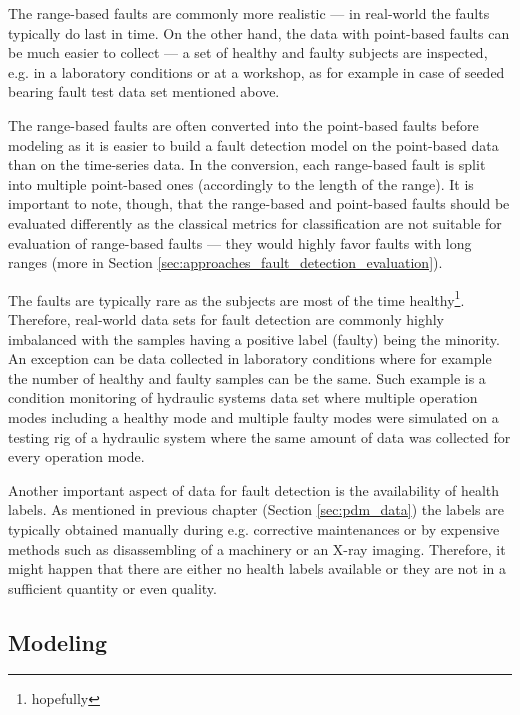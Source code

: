 The range-based faults are commonly more realistic --- in real-world the faults typically do last in time.
On the other hand, the data with point-based faults can be much easier to collect --- a set of healthy and faulty subjects are inspected, e.g. in a laboratory conditions or at a workshop, as for example in case of seeded bearing fault test data set mentioned above.

The range-based faults are often converted into the point-based faults before modeling as it is easier to build a fault detection model on the point-based data than on the time-series data.
In the conversion, each range-based fault is split into multiple point-based ones (accordingly to the length of the range).
It is important to note, though, that the range-based and point-based faults should be evaluated differently as the classical metrics for classification are not suitable for evaluation of range-based faults --- they would highly favor faults with long ranges (more in Section \ref{sec:approaches_fault_detection_evaluation}).

The faults are typically rare as the subjects are most of the time  healthy\footnote{hopefully}.
Therefore, real-world data sets for fault detection are commonly highly imbalanced with the samples having a positive label (faulty) being the minority.
An exception can be data collected in laboratory conditions where for example the number of healthy and faulty samples can be the same.
Such example is a condition monitoring of hydraulic systems data set\cite{data_set_hydraulic_systems} where multiple operation modes including a healthy mode and multiple faulty modes were simulated on a testing rig of a hydraulic system where the same amount of data was collected for every operation mode.

Another important aspect of data for fault detection is the availability of health labels.
As mentioned in previous chapter (Section \ref{sec:pdm_data}) the labels are typically obtained manually during e.g. corrective maintenances or by expensive methods such as disassembling of a machinery or an X-ray imaging.
Therefore, it might happen that there are either no health labels available or they are not in a sufficient quantity or even quality.

\subsection{Modeling}

